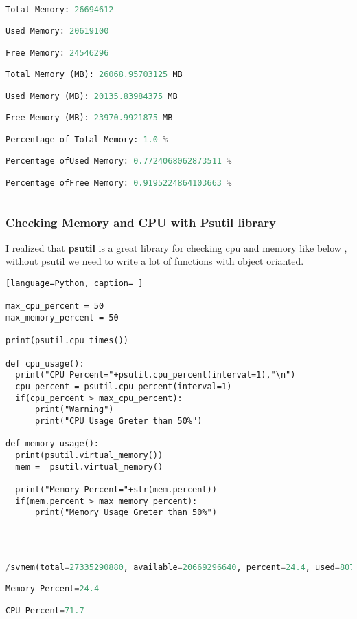\documentclass[onecolumn]{article}
\begin{document}
\begin{lstlisting}[language=Python, caption= Output]

Total Memory: 26694612 

Used Memory: 20619100 

Free Memory: 24546296 

Total Memory (MB): 26068.95703125 MB

Used Memory (MB): 20135.83984375 MB

Free Memory (MB): 23970.9921875 MB

Percentage of Total Memory: 1.0 %

Percentage ofUsed Memory: 0.7724068062873511 %

Percentage ofFree Memory: 0.9195224864103663 %
    
\end{lstlisting}

\subsubsection{Checking Memory and CPU with Psutil library}

I realized that \textbf{psutil} is a great library for checking cpu and memory like below , without psutil we need to write a lot of functions with object orianted.


\begin{lstlisting}[language=Python, caption= ]

max_cpu_percent = 50
max_memory_percent = 50
    
print(psutil.cpu_times())

def cpu_usage():
  print("CPU Percent="+psutil.cpu_percent(interval=1),"\n")
  cpu_percent = psutil.cpu_percent(interval=1)
  if(cpu_percent > max_cpu_percent):
      print("Warning")
      print("CPU Usage Greter than 50%")
    
def memory_usage():
  print(psutil.virtual_memory())
  mem =  psutil.virtual_memory()

  print("Memory Percent="+str(mem.percent))
  if(mem.percent > max_memory_percent):
      print("Memory Usage Greter than 50%")
    
   
\end{lstlisting}

\begin{lstlisting}[language=Python, caption=Output ]

/svmem(total=27335290880, available=20669296640, percent=24.4, used=8078446592, free=12509163520, active=7963410432, inactive=3783192576, buffers=658960384, cached=6088720384, shared=22503424, slab=2435268608)

Memory Percent=24.4

CPU Percent=71.7

\end{lstlisting}
\end{document}
